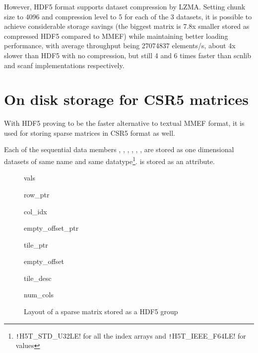 \documentclass[thesis=M,english]{FITthesis}[2019/12/23]
\newcommand{\csre}[1]{\texttt!#1!}
\begin{document}
However, HDF5 format supports dataset compression by LZMA. Setting chunk size to 4096 and compression level to 5 for each of the 3 datasets,
it is possible to achieve considerable storage savings (the biggest matrix is 7.8x smaller stored as compressed HDF5 compared to MMEF)
while maintaining better loading performance, with average throughput being 27074837 elements/s, about 4x slower than HDF5 with no compression,
but still 4 and 6 times faster than scnlib and scanf implementations respectively.

\section{On disk storage for CSR5 matrices}\label{csr5:onDisk}

With HDF5 proving to be the faster alternative to textual MMEF format, it is used for storing sparse
matrices in CSR5 format as well.

Each of the sequential data members , , , ,
, , are stored as one dimensional datasets of same name
and same datatype\footnote{\csre{H5T_STD_U32LE} for all the index arrays and \csre{H5T_IEEE_F64LE} for values}.
 is stored as an attribute.

\begin{figure}[!h]
    \begin{tcolorbox}[title=/A, colback=gray!30!white]
        \begin{infobox}[colback=hdtsc]
            vals
        \end{infobox}
        \begin{infobox}[colback=hdtsc]
            row\_ptr
        \end{infobox}
        \begin{infobox}[colback=hdtsc]
            col\_idx
        \end{infobox}
        \begin{infobox}[colback=hdtsc, width=0.3\textwidth]
            empty\_offset\_ptr
        \end{infobox}
        \begin{infobox}[colback=hdtsc]
            tile\_ptr
        \end{infobox}
        \begin{infobox}[colback=hdtsc]
            empty\_offset
        \end{infobox}
        \begin{infobox}[colback=hdtsc]
            tile\_desc
        \end{infobox}
        \begin{infobox}[colback=hdatc, width=0.2\textwidth]
            num\_cols
        \end{infobox}
    \end{tcolorbox}
    \caption{Layout of a sparse matrix stored as a HDF5 group}
\end{figure}
\end{document}
